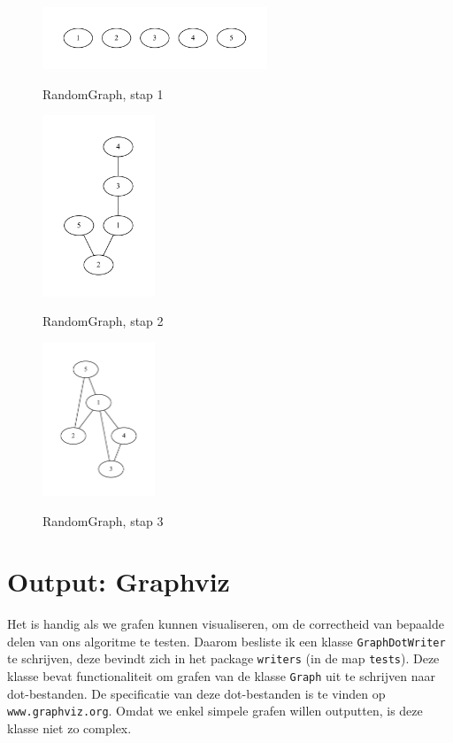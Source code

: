 \documentclass{article}
\begin{document}
\begin{figure}
\begin{center}
\includegraphics[width=0.6\textwidth]{images/randomgraph-01.pdf}
\caption{RandomGraph, stap 1}
\label{fig:randomgraph-01}
\includegraphics[width=0.3\textwidth]{images/randomgraph-02.pdf}
\caption{RandomGraph, stap 2}
\label{fig:randomgraph-02}
\includegraphics[width=0.3\textwidth]{images/randomgraph-03.pdf}
\caption{RandomGraph, stap 3}
\label{fig:randomgraph-03}
\end{center}
\end{figure}

\section{Output: Graphviz}
Het is handig als we grafen kunnen visualiseren, om de correctheid van bepaalde
delen van ons algoritme te testen. Daarom besliste ik een klasse
\verb#GraphDotWriter# te schrijven, deze bevindt zich in het package
\verb#writers# (in de map \verb#tests#). Deze klasse bevat functionaliteit om
grafen van de klasse \verb#Graph# uit te schrijven naar dot-bestanden. De
specificatie van deze dot-bestanden is te vinden op \verb#www.graphviz.org#.
Omdat we enkel simpele grafen willen outputten, is deze klasse niet zo complex.
\end{document}
